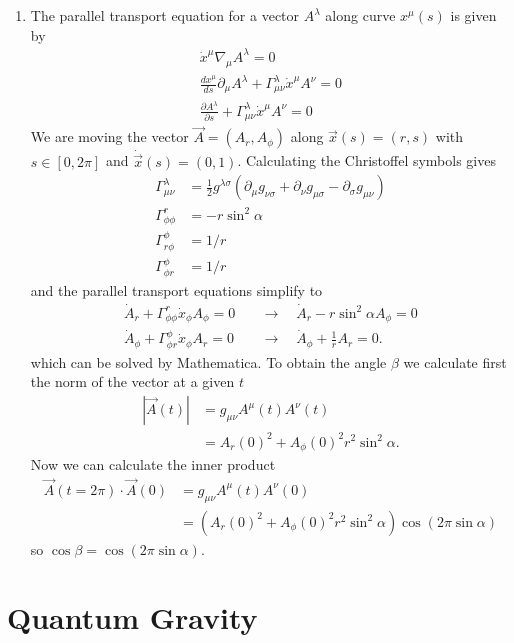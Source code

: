\documentclass[10pt,a4paper]{article}
\theoremstyle{definition}
\begin{document}
\begin{enumerate}
\item The parallel transport equation for a vector $A^\lambda$ along curve $x^\mu(s)$ is given by
\begin{align}
\dot x^\mu\nabla_\mu A^\lambda=0\\
\frac{dx^\mu}{ds}\partial_\mu A^\lambda+\Gamma^\lambda_{\mu\nu}\dot x^{\mu}A^\nu=0\\
\frac{\partial A^\lambda}{\partial s}+\Gamma^\lambda_{\mu\nu}\dot x^{\mu}A^\nu=0
\end{align}
We are moving the vector $\vec{A}=(A_r,A_\phi)$ along $\vec{x}(s)=(r,s)$ with $s\in[0,2\pi]$ and $\dot{\vec{x}}(s)=(0,1)$. Calculating the Christoffel symbols gives 
\begin{align}
\Gamma^\lambda_{\mu\nu}&=\frac{1}{2}g^{\lambda\sigma}(\partial_\mu g_{\nu\sigma}+\partial_\nu g_{\mu\sigma}-\partial_\sigma g_{\mu\nu})\\
\Gamma^r_{\phi\phi}&=-r\sin^2\alpha\\
\Gamma^\phi_{r\phi}&=1/r\\
\Gamma^\phi_{\phi r}&=1/r
\end{align}
and the parallel transport equations simplify to
\begin{align}
\dot{A}_r+\Gamma^r_{\phi\phi}\dot{x}_\phi A_\phi=0&\quad\rightarrow\quad \dot{A}_r-r\sin^2\alpha A_\phi=0\\
\dot{A}_\phi+\Gamma^\phi_{\phi r}\dot{x}_\phi A_r=0&\quad\rightarrow\quad \dot{A}_\phi+\frac{1}{r}A_r=0.
\end{align}
which can be solved by Mathematica. To obtain the angle $\beta$ we calculate first the norm of the vector at a given $t$
\begin{align}
	|\vec{A}(t)|&=g_{\mu\nu}A^\mu(t) A^\nu(t)\\
	&=A_r(0)^2+A_\phi(0)^2r^2\sin^2\alpha.
\end{align}
Now we can calculate the inner product
\begin{align}
	\vec{A}(t=2\pi)\cdot\vec{A}(0)&=g_{\mu\nu}A^\mu(t) A^\nu(0)\\
	&=(A_r(0)^2+A_\phi(0)^2r^2\sin^2\alpha)\cos(2\pi\sin\alpha)
\end{align}
so $\cos\beta=\cos(2\pi\sin\alpha)$.

\end{enumerate}



\newpage
\section{Quantum Gravity}
\end{document}
